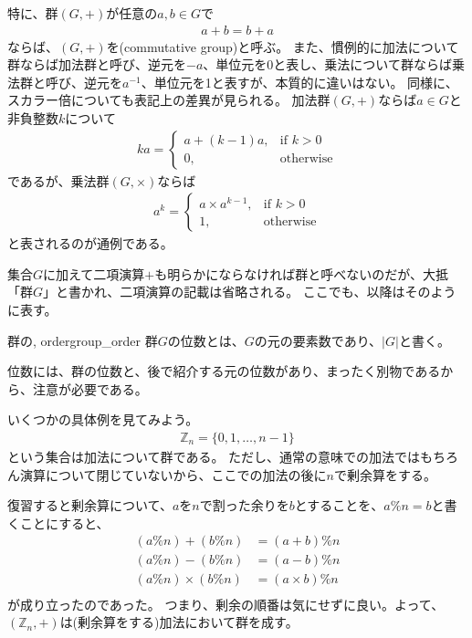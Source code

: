 特に、群$(G,+)$が任意の$a,b{\in}G$で
\begin{eqnarray*}
a + b = b + a
\end{eqnarray*}
ならば、$(G,+)$を(commutative group)と呼ぶ。
また、慣例的に加法について群ならば加法群と呼び、逆元を$-a$、単位元を0と表し、乗法について群ならば乗法群と呼び、逆元を$a^{-1}$、単位元を1と表すが、本質的に違いはない。
同様に、スカラー倍についても表記上の差異が見られる。
加法群$(G,+)$ならば$a\in{G}$と非負整数$k$について
\begin{eqnarray*}
ka=
\begin{cases}
a + (k-1)a, & \mbox{if } k > 0\\
0, & \mbox{otherwise}
\end{cases}
\end{eqnarray*}
であるが、乗法群$(G,\times)$ならば
\begin{eqnarray*}
a^{k}=
\begin{cases}
a \times a^{k-1}, & \mbox{if } k > 0\\
1, & \mbox{otherwise}
\end{cases}
\end{eqnarray*}
と表されるのが通例である。

集合$G$に加えて二項演算$+$も明らかにならなければ群と呼べないのだが、大抵「群$G$」と書かれ、二項演算の記載は省略される。
ここでも、以降はそのように表す。

\begin{Defi}{群の, order}{group_order}
群$G$の位数とは、$G$の元の要素数であり、$|G|$と書く。
\end{Defi}

位数には、群の位数と、後で紹介する元の位数があり、まったく別物であるから、注意が必要である。

いくつかの具体例を見てみよう。
\begin{align*}
\mathbb{Z}_n = \{0,1, \ldots, n-1\}
\end{align*}
という集合は加法について群である。
ただし、通常の意味での加法ではもちろん演算について閉じていないから、ここでの加法の後に$n$で剰余算をする。

復習すると剰余算について、$a$を$n$で割った余りを$b$とすることを、$a \% n =b$と書くことにすると、
\begin{align*}
(a \% n) + (b \% n) &= (a + b) \% n\\
(a \% n) - (b \% n) &= (a - b) \% n\\
(a \% n) \times (b \% n) &= (a \times b) \% n\\
\end{align*}
が成り立ったのであった。
つまり、剰余の順番は気にせずに良い。よって、$(\mathbb{Z}_n,+)$は(剰余算をする)加法において群を成す。

